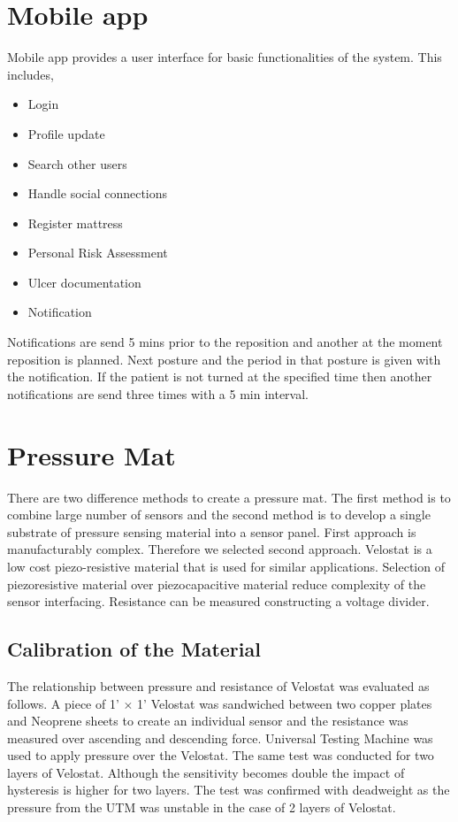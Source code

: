 \section{Mobile app} 

Mobile app provides a user interface for basic functionalities of the system. This includes,
\begin{itemize}
	\item Login
	\item Profile update
	\item Search other users
	\item Handle social connections
	\item Register mattress
	\item Personal Risk Assessment
	\item Ulcer documentation
	\item Notification
\end{itemize}

Notifications are  send 5  mins prior to the reposition and another at the moment reposition is planned. Next posture and the period in that posture is given with the notification. If the patient is not turned at the specified time then another notifications are send three times with a 5 min interval.




\section{Pressure Mat}

There are two difference methods to create a pressure mat. The first method is to combine large number of sensors and the second method is to develop a single substrate of pressure sensing material into a sensor panel. First approach is manufacturably complex. Therefore we selected second approach. Velostat\textsuperscript{\textregistered} is a low cost piezo-resistive material that is used for similar applications. \cite{velostat1,velostat2,velsensor} Selection of piezoresistive material over piezocapacitive material reduce complexity of the sensor interfacing. Resistance can be measured constructing a voltage divider. 


\subsection{Calibration of the Material}

The relationship between pressure and resistance of Velostat was evaluated as follows. A piece of 1' $\times$ 1' Velostat was sandwiched between two copper plates and Neoprene sheets to create an individual sensor and the resistance was measured over ascending and descending force. 
 Universal Testing Machine was used to apply pressure over the Velostat. The same test was conducted for two layers of Velostat. Although the sensitivity becomes double the impact of hysteresis is higher for two layers. The test was confirmed with deadweight as the pressure from the UTM was unstable in the case of 2 layers of Velostat.

